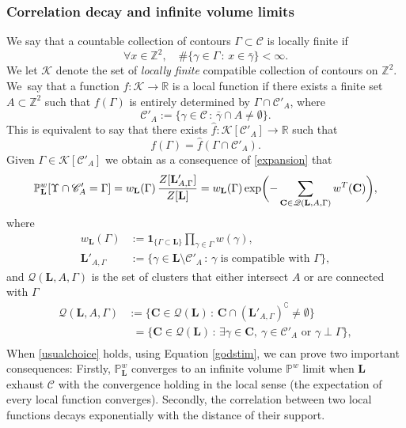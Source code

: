 \documentclass[10pt]{amsart}
\let\mathcal\mathscr
\newcommand{\sep}{\,:\,}
\numberwithin{equation}{section}
\theoremstyle{plain}
\theoremstyle{definition}
\newcommand{\ind}{\mathbf{1}}
\newcommand{\cc}{\complement}
\newcommand{\cQ}{{\ensuremath{\mathcal Q}} }
\newcommand{\cC}{{\ensuremath{\mathcal C}} }
\newcommand{\cK}{{\ensuremath{\mathcal K}} }
\newcommand{\bC}{{\ensuremath{\mathbf C}} }
\newcommand{\bL}{{\ensuremath{\mathbf L}} }
\newcommand{\bbP}{{\ensuremath{\mathbb P}} }
\newcommand{\bbR}{{\ensuremath{\mathbb R}} }
\newcommand{\bbZ}{{\ensuremath{\mathbb Z}} }
\newcommand{\gG}{\Gamma}
\begin{document}
\subsubsection{Correlation decay and infinite volume limits}\label{fffb}

We say that a countable collection of contours $\gG\subset \cC$ is locally finite if
\begin{equation}\label{locallyfinite}
\forall x\in \bbZ^2, \quad \#\{ \gamma \in \gG \sep x\in \bar \gamma\}<\infty.
\end{equation}
We let $\cK$ denote the set of \textit{locally finite} compatible collection of contours on $\bbZ^2$.
We~say that a function $f: \cK\to \bbR$ is a local function if there exists a finite set
$A \subset \bbZ^2$ such that $f(\gG)$ is entirely determined by $\gG\cap \cC'_A$,
where
\[
\cC'_A:= \{ \gamma \in \cC \sep \bar \gamma \cap A\ne \emptyset \}.
\]
This is equivalent to say that there exists
$\hat f: \cK[\cC'_A]\to \bbR$ such that
\[
f(\gG)=\hat f(\gG\cap \cC'_{A}).
\]
Given $\gG\in \cK[\cC'_{A}]$ we obtain as a consequence of \eqref{expansion} that
\begin{equation}\label{godstim}
\bbP^w_{\bL}[\Upsilon \cap \cC'_{A}=\gG]=w_{\bL}(\gG)\,\frac{Z[\bL'_{A,\gG}]}{Z[\bL]}\\
=
w_{\bL}(\gG)\exp\biggl(-\sum_{\bC\in \cQ(\bL,A,\gG)} w^T(\bC)\biggr),
\end{equation}
where\vspace*{-3pt}
\begin{equation*}\begin{split}
w_\bL(\gG)&:=\ind_{\{\gG\subset \bL\}}\prod_{\gamma\in \gG}w(\gamma),\\
\bL'_{A,\gG}&:=\{ \gamma \in \bL \setminus \cC'_A \sep \gamma \text{ is compatible with } \gG\},
\end{split}
\end{equation*}
and $\cQ(\bL,A,\gG)$ is the set of clusters that either intersect $A$ or are connected with $\gG$
\begin{equation*}
\begin{split}
\cQ(\bL,A,\gG)&:= \{\bC\in \cQ(\bL) \sep \bC\cap (\bL'_{A,\gG})^\cc\ne \emptyset \}\\
&\phantom{:}=\{\bC\in \cQ(\bL) \sep \exists \gamma\in \bC, \ \gamma\in \cC'_A \text{ or } \gamma \perp \gG \},\\
\end{split}
\end{equation*}
When \eqref{usualchoice} holds, using Equation \eqref{godstim},
we can prove two important consequences: Firstly, $\bbP^w_{\bL}$ converges to an infinite volume $\bbP^w$ limit when
$\bL$ exhaust $\cC$ with the convergence holding in the local sense (the expectation of every local function converges).
Secondly, the correlation between two local functions decays exponentially with the distance of their support.
\end{document}
